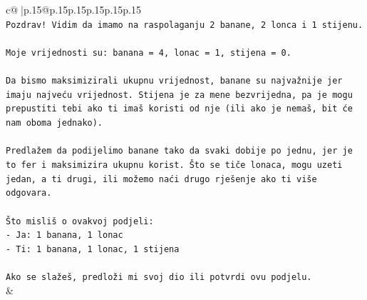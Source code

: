 \documentclass{article}
\begin{document}
{\begin{supertabular}{c@{$\;$}|p{.15\linewidth}@{}p{.15\linewidth}p{.15\linewidth}p{.15\linewidth}p{.15\linewidth}p{.15\linewidth}}
{{{\\ 
\texttt{Pozdrav! Vidim da imamo na raspolaganju 2 banane, 2 lonca i 1 stijenu.} \\
\\ 
\texttt{Moje vrijednosti su: banana = 4, lonac = 1, stijena = 0.} \\
\\ 
\texttt{Da bismo maksimizirali ukupnu vrijednost, banane su najvažnije jer imaju najveću vrijednost. Stijena je za mene bezvrijedna, pa je mogu prepustiti tebi ako ti imaš koristi od nje (ili ako je nemaš, bit će nam oboma jednako).} \\
\\ 
\texttt{Predlažem da podijelimo banane tako da svaki dobije po jednu, jer je to fer i maksimizira ukupnu korist. Što se tiče lonaca, mogu uzeti jedan, a ti drugi, ili možemo naći drugo rješenje ako ti više odgovara.} \\
\\ 
\texttt{Što misliš o ovakvoj podjeli:} \\
\texttt{{-} Ja: 1 banana, 1 lonac} \\
\texttt{{-} Ti: 1 banana, 1 lonac, 1 stijena} \\
\\ 
\texttt{Ako se slažeš, predloži mi svoj dio ili potvrdi ovu podjelu.} \\
            }
        }
    }
    & \\ \\


\end{supertabular}}
\end{document}
